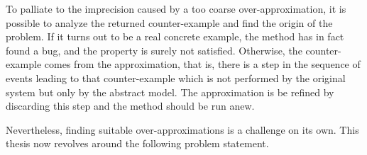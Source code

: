 


To palliate to the imprecision caused by a too coarse
over-approximation, it is possible to analyze the returned
counter-example and find the origin of the problem. If it turns out to
be a real concrete example, the method has in fact found a bug, and
the property is surely not satisfied. Otherwise, the counter-example
comes from the approximation, that is, there is a step in the sequence
of events leading to that counter-example which is not performed by
the original system but only by the abstract model. The approximation
is be refined by discarding this step and the method should be run
anew.

Nevertheless, finding suitable over-approximations is a challenge on
its own. %
This thesis now revolves around the following problem statement.
%
%
